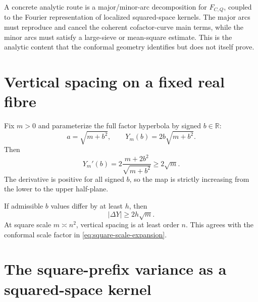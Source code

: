 \documentclass[11pt]{article}
\theoremstyle{definition}
\theoremstyle{remark}
\newcommand{\1}{\mathbf{1}}
\newcommand{\R}{\mathbb{R}}
\begin{document}
A concrete analytic route is a major/minor-arc decomposition for
$F_{C,Q}$, coupled to the Fourier representation of localized
squared-space kernels.  The major arcs must reproduce and cancel the
coherent cofactor-curve main terms, while the minor arcs must satisfy a
large-sieve or mean-square estimate.  This is the analytic content that
the conformal geometry identifies but does not itself prove.

\section{Vertical spacing on a fixed real fibre}
\label{sec:vertical-spacing}

Fix $m>0$ and parameterize the full factor hyperbola by signed $b\in\R$:
\begin{equation}
 a=\sqrt{m+b^2},
 \qquad
 Y_m(b)=2b\sqrt{m+b^2}.
 \label{eq:Y-b}
\end{equation}
Then
\begin{equation}
 Y_m'(b)
 =2\frac{m+2b^2}{\sqrt{m+b^2}}
 \ge2\sqrt m.
 \label{eq:Y-derivative}
\end{equation}
The derivative is positive for all signed $b$, so the map is strictly increasing from the lower to the upper half-plane.

If admissible $b$ values differ by at least $h$, then
\begin{equation}
 |\Delta Y|\ge2h\sqrt m.
 \label{eq:Y-spacing}
\end{equation}
At square scale $m\asymp n^2$, vertical spacing is at least order $n$.  This agrees with the conformal scale factor in \cref{eq:square-scale-expansion}.

\section{The square-prefix variance as a squared-space kernel}
\label{sec:variance-kernel}
\end{document}
